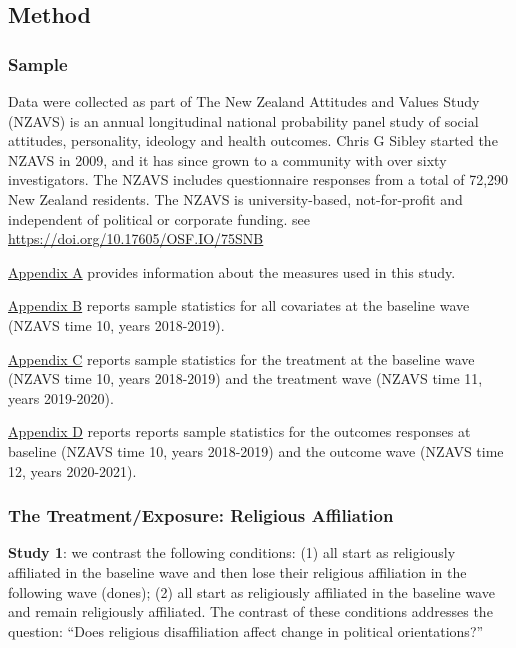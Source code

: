 \documentclass[
  singlecolumn]{article}
\begin{document}
\subsection{Method}\label{method}

\subsubsection{Sample}\label{sample}

Data were collected as part of The New Zealand Attitudes and Values
Study (NZAVS) is an annual longitudinal national probability panel study
of social attitudes, personality, ideology and health outcomes. Chris G
Sibley started the NZAVS in 2009, and it has since grown to a community
with over sixty investigators. The NZAVS includes questionnaire
responses from a total of 72,290 New Zealand residents. The NZAVS is
university-based, not-for-profit and independent of political or
corporate funding. see \url{https://doi.org/10.17605/OSF.IO/75SNB}

\hyperref[appendix-measures]{Appendix A} provides information about the
measures used in this study.

\hyperref[appendix-demographics]{Appendix B} reports sample statistics
for all covariates at the baseline wave (NZAVS time 10, years
2018-2019).

\hyperref[appendix-exposures]{Appendix C} reports sample statistics for
the treatment at the baseline wave (NZAVS time 10, years 2018-2019) and
the treatment wave (NZAVS time 11, years 2019-2020).

\hyperref[appendix-outcomes]{Appendix D} reports reports sample
statistics for the outcomes responses at baseline (NZAVS time 10, years
2018-2019) and the outcome wave (NZAVS time 12, years 2020-2021).

\subsubsection{The Treatment/Exposure: Religious
Affiliation}\label{the-treatmentexposure-religious-affiliation}

\textbf{Study 1}: we contrast the following conditions: (1) all start as
religiously affiliated in the baseline wave and then lose their
religious affiliation in the following wave (dones); (2) all start as
religiously affiliated in the baseline wave and remain religiously
affiliated. The contrast of these conditions addresses the question:
``Does religious disaffiliation affect change in political
orientations?''
\end{document}
